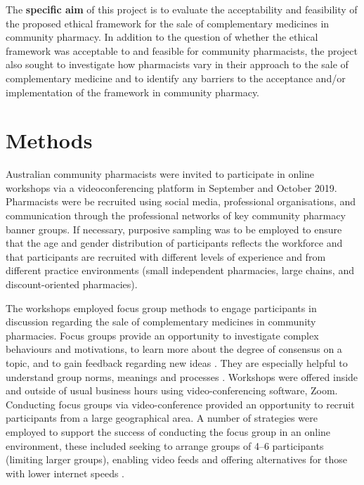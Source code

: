 \documentclass[11pt,a4paper]{article}
\begin{document}
The \textbf{specific aim} of this project is to evaluate the
acceptability and feasibility of the proposed ethical framework for the
sale of complementary medicines in community pharmacy. In addition to
the question of whether the ethical framework was acceptable to and
feasible for community pharmacists, the project also sought to
investigate how pharmacists vary in their approach to the sale of
complementary medicine and to identify any barriers to the acceptance
and/or implementation of the framework in community pharmacy.

\section{Methods}\label{methods}

Australian community pharmacists were invited to participate in online
workshops via a videoconferencing platform in September and October
2019. Pharmacists were be recruited using social media, professional
organisations, and communication through the professional networks of
key community pharmacy banner groups. If necessary, purposive sampling
was to be employed to ensure that the age and gender distribution of
participants reflects the workforce and that participants are recruited
with different levels of experience and from different practice
environments (small independent pharmacies, large chains, and
discount-oriented pharmacies).

The workshops employed focus group methods to engage participants in
discussion regarding the sale of complementary medicines in community
pharmacies. Focus groups provide an opportunity to investigate complex
behaviours and motivations, to learn more about the degree of consensus
on a topic, and to gain feedback regarding new ideas
\autocites{Basch1987}{Knodel1993}. They are especially helpful to
understand group norms, meanings and processes \autocite{BarbourFG2011}.
Workshops were offered inside and outside of usual business hours using
video-conferencing software, Zoom. Conducting focus groups via
video-conference provided an opportunity to recruit participants from a
large geographical area. A number of strategies were employed to support
the success of conducting the focus group in an online environment,
these included seeking to arrange groups of 4--6 participants (limiting
larger groups), enabling video feeds and offering alternatives for those
with lower internet speeds \autocite{Gaiser2017}.
\end{document}
